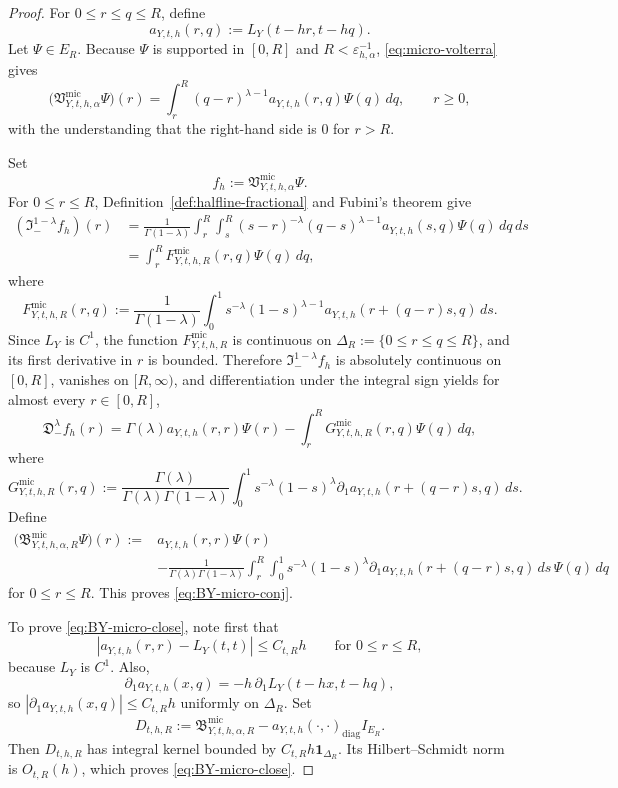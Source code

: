 \documentclass[11pt,a4paper]{amsart}
\theoremstyle{plain}
\theoremstyle{definition}
\theoremstyle{remark}
\newcommand{\one}{\mathbf 1}
\begin{document}
\begin{proof}
For \(0\le r\le q\le R\), define
\[
a_{Y,t,h}(r,q):=L_Y(t-hr,t-hq).
\]
Let \(\Psi\in E_R\). Because \(\Psi\) is supported in \([0,R]\) and \(R<\varepsilon_{h,\alpha}^{-1}\),
\eqref{eq:micro-volterra} gives
\[
\bigl(
\mathfrak V_{Y,t,h,\alpha}^{\mathrm{mic}}\Psi
\bigr)(r)
=
\int_r^R (q-r)^{\lambda-1}a_{Y,t,h}(r,q)\Psi(q)\,dq,
\qquad r\ge0,
\]
with the understanding that the right-hand side is \(0\) for \(r>R\).

Set
\[
f_h:=\mathfrak V_{Y,t,h,\alpha}^{\mathrm{mic}}\Psi.
\]
For \(0\le r\le R\), Definition~\ref{def:halfline-fractional} and Fubini's theorem give
\begin{align*}
(\mathfrak I_-^{1-\lambda}f_h)(r)
&=
\frac{1}{\Gamma(1-\lambda)}
\int_r^R\int_s^R
(s-r)^{-\lambda}(q-s)^{\lambda-1}
a_{Y,t,h}(s,q)\Psi(q)\,dq\,ds \\
&=
\int_r^R F_{Y,t,h,R}^{\mathrm{mic}}(r,q)\Psi(q)\,dq,
\end{align*}
where
\[
F_{Y,t,h,R}^{\mathrm{mic}}(r,q)
:=
\frac{1}{\Gamma(1-\lambda)}
\int_0^1
s^{-\lambda}(1-s)^{\lambda-1}
a_{Y,t,h}(r+(q-r)s,q)\,ds.
\]
Since \(L_Y\) is \(C^1\), the function \(F_{Y,t,h,R}^{\mathrm{mic}}\) is continuous on
\(\Delta_R:=\{0\le r\le q\le R\}\), and its first derivative in \(r\) is bounded. Therefore
\(\mathfrak I_-^{1-\lambda}f_h\) is absolutely continuous on \([0,R]\), vanishes on \([R,\infty)\),
and differentiation under the integral sign yields for almost every \(r\in[0,R]\),
\[
\mathfrak D_-^\lambda f_h(r)
=
\Gamma(\lambda)a_{Y,t,h}(r,r)\Psi(r)
-\int_r^R G_{Y,t,h,R}^{\mathrm{mic}}(r,q)\Psi(q)\,dq,
\]
where
\[
G_{Y,t,h,R}^{\mathrm{mic}}(r,q)
:=
\frac{\Gamma(\lambda)}{\Gamma(\lambda)\Gamma(1-\lambda)}
\int_0^1
s^{-\lambda}(1-s)^\lambda
\partial_1 a_{Y,t,h}(r+(q-r)s,q)\,ds.
\]
Define
\begin{align*}
\bigl(
\mathfrak B_{Y,t,h,\alpha,R}^{\mathrm{mic}}\Psi
\bigr)(r)
:={}&
a_{Y,t,h}(r,r)\Psi(r) \\
&-
\frac{1}{\Gamma(\lambda)\Gamma(1-\lambda)}
\int_r^R\int_0^1
s^{-\lambda}(1-s)^\lambda
\partial_1 a_{Y,t,h}(r+(q-r)s,q)\,ds\,\Psi(q)\,dq
\end{align*}
for \(0\le r\le R\). This proves \eqref{eq:BY-micro-conj}.

To prove \eqref{eq:BY-micro-close}, note first that
\[
|a_{Y,t,h}(r,r)-L_Y(t,t)|\le C_{t,R}h
\qquad\text{for }0\le r\le R,
\]
because \(L_Y\) is \(C^1\). Also,
\[
\partial_1 a_{Y,t,h}(x,q)
=
-h\,\partial_1L_Y(t-hx,t-hq),
\]
so \(|\partial_1 a_{Y,t,h}(x,q)|\le C_{t,R}h\) uniformly on \(\Delta_R\). Set
\[
D_{t,h,R}:=
\mathfrak B_{Y,t,h,\alpha,R}^{\mathrm{mic}}-a_{Y,t,h}(\cdot,\cdot)_{\mathrm{diag}}I_{E_R}.
\]
Then \(D_{t,h,R}\) has integral kernel bounded by \(C_{t,R}h\one_{\Delta_R}\). Its
Hilbert--Schmidt norm is \(O_{t,R}(h)\), which proves \eqref{eq:BY-micro-close}.
\end{proof}
\end{document}
